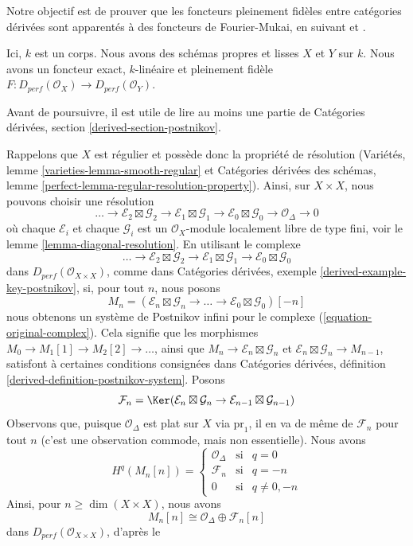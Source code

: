 \noindent
Notre objectif est de prouver que les foncteurs pleinement fidèles entre catégories dérivées
sont apparentés à des foncteurs de Fourier-Mukai, en suivant
\cite{Orlov-K3} et \cite{Ballard}.

\begin{situation}
\label{situation-fully-faithful}
Ici, $k$ est un corps. Nous avons des schémas propres et lisses $X$ et $Y$ sur $k$.
Nous avons un foncteur exact, $k$-linéaire et pleinement fidèle
$F : D_{perf}(\mathcal{O}_X) \to D_{perf}(\mathcal{O}_Y)$.
\end{situation}

\noindent
Avant de poursuivre, il est utile de lire au moins une partie de
Catégories dérivées, section \ref{derived-section-postnikov}.

\medskip\noindent
Rappelons que $X$ est régulier et possède donc la propriété de résolution
(Variétés, lemme \ref{varieties-lemma-smooth-regular} et
Catégories dérivées des schémas, lemme
\ref{perfect-lemma-regular-resolution-property}). Ainsi,
sur $X \times X$, nous pouvons choisir une résolution
$$
\ldots \to
\mathcal{E}_2 \boxtimes \mathcal{G}_2 \to
\mathcal{E}_1 \boxtimes \mathcal{G}_1 \to
\mathcal{E}_0 \boxtimes \mathcal{G}_0 \to
\mathcal{O}_\Delta \to 0
$$
où chaque $\mathcal{E}_i$ et chaque $\mathcal{G}_i$ est un
$\mathcal{O}_X$-module localement libre de type fini, voir le
lemme \ref{lemma-diagonal-resolution}.
En utilisant le complexe
\begin{equation}
\label{equation-original-complex}
\ldots \to
\mathcal{E}_2 \boxtimes \mathcal{G}_2 \to
\mathcal{E}_1 \boxtimes \mathcal{G}_1 \to
\mathcal{E}_0 \boxtimes \mathcal{G}_0
\end{equation}
dans $D_{perf}(\mathcal{O}_{X \times X})$, comme dans
Catégories dérivées, exemple \ref{derived-example-key-postnikov},
si, pour tout $n$, nous posons
$$
M_n = (\mathcal{E}_n \boxtimes \mathcal{G}_n \to \ldots \to
\mathcal{E}_0 \boxtimes \mathcal{G}_0)[-n]
$$
nous obtenons un système de Postnikov infini pour le complexe
(\ref{equation-original-complex}). Cela signifie que
les morphismes $M_0 \to M_1[1] \to M_2[2] \to \ldots$, ainsi que
$M_n \to \mathcal{E}_n \boxtimes \mathcal{G}_n$ et
$\mathcal{E}_n \boxtimes \mathcal{G}_n \to M_{n - 1}$,
satisfont à certaines conditions consignées dans
Catégories dérivées, définition \ref{derived-definition-postnikov-system}.
Posons
$$
\mathcal{F}_n = \Ker(\mathcal{E}_n \boxtimes \mathcal{G}_n \to
\mathcal{E}_{n - 1} \boxtimes \mathcal{G}_{n - 1})
$$
Observons que, puisque $\mathcal{O}_\Delta$ est plat sur $X$ via $\text{pr}_1$,
il en va de même de $\mathcal{F}_n$ pour tout $n$ (c'est une observation
commode, mais non essentielle). Nous avons
$$
H^q(M_n[n]) = \left\{
\begin{matrix}
\mathcal{O}_\Delta & \text{si} & q = 0 \\
\mathcal{F}_n & \text{si} & q = -n \\
0 & \text{si} & q \not = 0, -n
\end{matrix}
\right.
$$
Ainsi, pour $n \geq \dim(X \times X)$, nous avons
$$
M_n[n] \cong \mathcal{O}_\Delta \oplus \mathcal{F}_n[n]
$$
dans $D_{perf}(\mathcal{O}_{X \times X})$, d'après le

